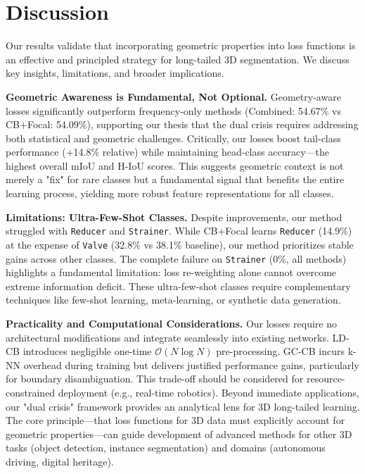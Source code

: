\documentclass[preprint,12pt]{elsarticle}
\begin{document}
\section{Discussion}
\label{sec:discussion}
Our results validate that incorporating geometric properties into loss functions is an effective and principled strategy for long-tailed 3D segmentation. We discuss key insights, limitations, and broader implications.

\textbf{Geometric Awareness is Fundamental, Not Optional.} Geometry-aware losses significantly outperform frequency-only methods (Combined: 54.67\% vs CB+Focal: 54.09\%), supporting our thesis that the dual crisis requires addressing both statistical and geometric challenges. Critically, our losses boost tail-class performance (+14.8\% relative) while maintaining head-class accuracy—the highest overall mIoU and H-IoU scores. This suggests geometric context is not merely a "fix" for rare classes but a fundamental signal that benefits the entire learning process, yielding more robust feature representations for all classes.

\textbf{Limitations: Ultra-Few-Shot Classes.} Despite improvements, our method struggled with \texttt{Reducer} and \texttt{Strainer}. While CB+Focal learns \texttt{Reducer} (14.9\%) at the expense of \texttt{Valve} (32.8\% vs 38.1\% baseline), our method prioritizes stable gains across other classes. The complete failure on \texttt{Strainer} (0\%, all methods) highlights a fundamental limitation: loss re-weighting alone cannot overcome extreme information deficit. These ultra-few-shot classes require complementary techniques like few-shot learning, meta-learning, or synthetic data generation.

\textbf{Practicality and Computational Considerations.} Our losses require no architectural modifications and integrate seamlessly into existing networks. LD-CB introduces negligible one-time \(\mathcal{O}(N \log N)\) pre-processing. GC-CB incurs k-NN overhead during training but delivers justified performance gains, particularly for boundary disambiguation. This trade-off should be considered for resource-constrained deployment (e.g., real-time robotics). Beyond immediate applications, our "dual crisis" framework provides an analytical lens for 3D long-tailed learning. The core principle—that loss functions for 3D data must explicitly account for geometric properties—can guide development of advanced methods for other 3D tasks (object detection, instance segmentation) and domains (autonomous driving, digital heritage).
\end{document}

